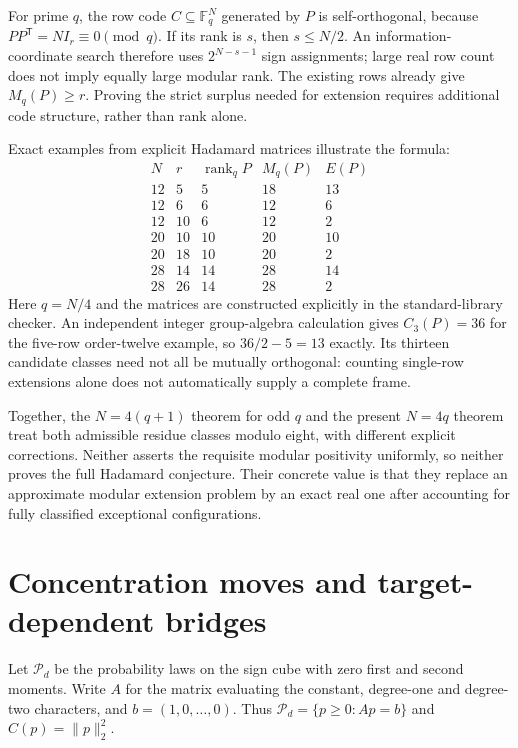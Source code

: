 \documentclass[11pt]{article}
\begin{document}
For prime $q$, the row code $C\subseteq\mathbb F_q^N$ generated by
$P$ is self-orthogonal, because $PP^{\mathsf T}=NI_r\equiv0\pmod q$.
If its rank is $s$, then $s\le N/2$. An information-coordinate search
therefore uses $2^{N-s-1}$ sign assignments; large real row count
does not imply equally large modular rank. The existing rows already
give $M_q(P)\ge r$. Proving the strict surplus needed for extension
requires additional code structure, rather than rank alone.

Exact examples from explicit Hadamard matrices illustrate the formula:
\[
\begin{array}{c|r|r|r|r}
N&r&\operatorname{rank}_{q}P&M_q(P)&E(P)\\\hline
12&5&5&18&13\\
12&6&6&12&6\\
12&10&6&12&2\\
20&10&10&20&10\\
20&18&10&20&2\\
28&14&14&28&14\\
28&26&14&28&2
\end{array}
\]
Here $q=N/4$ and the matrices are constructed explicitly in the
standard-library checker. An independent integer group-algebra
calculation gives $C_3(P)=36$ for the five-row order-twelve example,
so $36/2-5=13$ exactly. Its thirteen candidate classes need not all
be mutually orthogonal: counting single-row extensions alone does
not automatically supply a complete frame.

Together, the $N=4(q+1)$ theorem for odd $q$ and the present
$N=4q$ theorem treat both admissible residue classes modulo eight,
with different explicit corrections. Neither asserts the requisite
modular positivity uniformly, so neither proves the full Hadamard
conjecture. Their concrete value is that they replace an approximate
modular extension problem by an exact real one after accounting for
fully classified exceptional configurations.

\section{Concentration moves and target-dependent bridges}

Let $\mathcal P_d$ be the probability laws on the sign cube with
zero first and second moments. Write $A$ for the matrix evaluating
the constant, degree-one and degree-two characters, and $b=(1,0,\ldots,0)$.
Thus $\mathcal P_d=\{p\ge0:Ap=b\}$ and $C(p)=\|p\|_2^2$.
\end{document}
